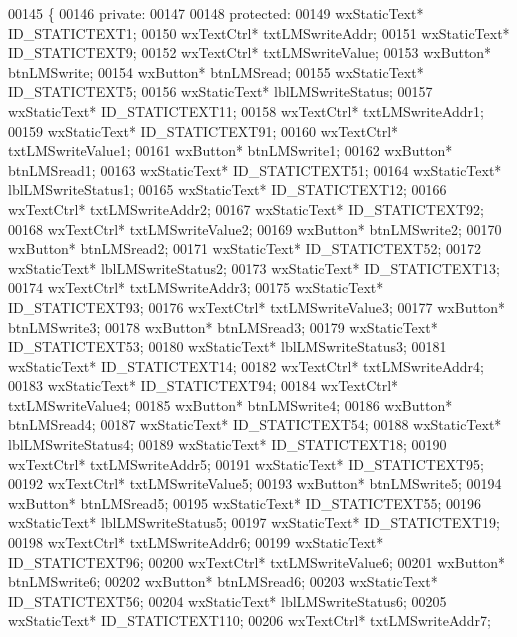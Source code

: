 \begin{DoxyCode}
00145 \{
00146     \textcolor{keyword}{private}:
00147     
00148     \textcolor{keyword}{protected}:
00149         wxStaticText* ID_STATICTEXT1;
00150         wxTextCtrl* txtLMSwriteAddr;
00151         wxStaticText* ID_STATICTEXT9;
00152         wxTextCtrl* txtLMSwriteValue;
00153         wxButton* btnLMSwrite;
00154         wxButton* btnLMSread;
00155         wxStaticText* ID_STATICTEXT5;
00156         wxStaticText* lblLMSwriteStatus;
00157         wxStaticText* ID_STATICTEXT11;
00158         wxTextCtrl* txtLMSwriteAddr1;
00159         wxStaticText* ID_STATICTEXT91;
00160         wxTextCtrl* txtLMSwriteValue1;
00161         wxButton* btnLMSwrite1;
00162         wxButton* btnLMSread1;
00163         wxStaticText* ID_STATICTEXT51;
00164         wxStaticText* lblLMSwriteStatus1;
00165         wxStaticText* ID_STATICTEXT12;
00166         wxTextCtrl* txtLMSwriteAddr2;
00167         wxStaticText* ID_STATICTEXT92;
00168         wxTextCtrl* txtLMSwriteValue2;
00169         wxButton* btnLMSwrite2;
00170         wxButton* btnLMSread2;
00171         wxStaticText* ID_STATICTEXT52;
00172         wxStaticText* lblLMSwriteStatus2;
00173         wxStaticText* ID_STATICTEXT13;
00174         wxTextCtrl* txtLMSwriteAddr3;
00175         wxStaticText* ID_STATICTEXT93;
00176         wxTextCtrl* txtLMSwriteValue3;
00177         wxButton* btnLMSwrite3;
00178         wxButton* btnLMSread3;
00179         wxStaticText* ID_STATICTEXT53;
00180         wxStaticText* lblLMSwriteStatus3;
00181         wxStaticText* ID_STATICTEXT14;
00182         wxTextCtrl* txtLMSwriteAddr4;
00183         wxStaticText* ID_STATICTEXT94;
00184         wxTextCtrl* txtLMSwriteValue4;
00185         wxButton* btnLMSwrite4;
00186         wxButton* btnLMSread4;
00187         wxStaticText* ID_STATICTEXT54;
00188         wxStaticText* lblLMSwriteStatus4;
00189         wxStaticText* ID_STATICTEXT18;
00190         wxTextCtrl* txtLMSwriteAddr5;
00191         wxStaticText* ID_STATICTEXT95;
00192         wxTextCtrl* txtLMSwriteValue5;
00193         wxButton* btnLMSwrite5;
00194         wxButton* btnLMSread5;
00195         wxStaticText* ID_STATICTEXT55;
00196         wxStaticText* lblLMSwriteStatus5;
00197         wxStaticText* ID_STATICTEXT19;
00198         wxTextCtrl* txtLMSwriteAddr6;
00199         wxStaticText* ID_STATICTEXT96;
00200         wxTextCtrl* txtLMSwriteValue6;
00201         wxButton* btnLMSwrite6;
00202         wxButton* btnLMSread6;
00203         wxStaticText* ID_STATICTEXT56;
00204         wxStaticText* lblLMSwriteStatus6;
00205         wxStaticText* ID_STATICTEXT110;
00206         wxTextCtrl* txtLMSwriteAddr7;

\end{DoxyCode}
